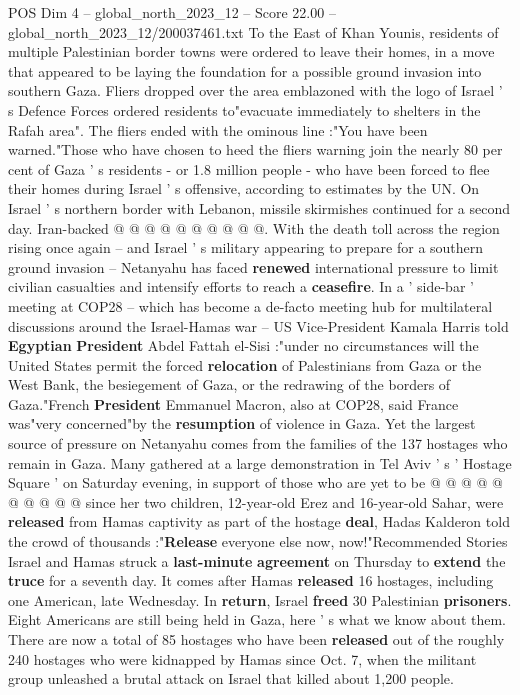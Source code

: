 \begin{textsample}{POS Dim 4 – global\_north\_2023\_12 – Score 22.00 – global\_north\_2023\_12/200037461.txt}
To the East of Khan Younis, residents of multiple Palestinian border towns were ordered to leave their homes, in a move that appeared to be laying the foundation for a possible ground invasion into southern Gaza.
Fliers dropped over the area emblazoned with the logo of Israel ' s Defence Forces ordered residents to"evacuate immediately to shelters in the Rafah area".
The fliers ended with the ominous line :"You have been warned."Those who have chosen to heed the fliers warning join the nearly 80 per cent of Gaza ' s residents - or 1.8 million people - who have been forced to flee their homes during Israel ' s offensive, according to estimates by the UN.
On Israel ' s northern border with Lebanon, missile skirmishes continued for a second day.
Iran-backed @ @ @ @ @ @ @ @ @ @.
With the death toll across the region rising once again -- and Israel ' s military appearing to prepare for a southern ground invasion -- Netanyahu has faced \textbf{renewed} international pressure to limit civilian casualties and intensify efforts to reach a \textbf{ceasefire}.
In a ' side-bar ' meeting at COP28 -- which has become a de-facto meeting hub for multilateral discussions around the Israel-Hamas war -- US Vice-President Kamala Harris told \textbf{Egyptian} \textbf{President} Abdel Fattah el-Sisi :"under no circumstances will the United States permit the forced \textbf{relocation} of Palestinians from Gaza or the West Bank, the besiegement of Gaza, or the redrawing of the borders of Gaza."French \textbf{President} Emmanuel Macron, also at COP28, said France was"very concerned"by the \textbf{resumption} of violence in Gaza.
Yet the largest source of pressure on Netanyahu comes from the families of the 137 hostages who remain in Gaza.
Many gathered at a large demonstration in Tel Aviv ' s ' Hostage Square ' on Saturday evening, in support of those who are yet to be @ @ @ @ @ @ @ @ @ @ since her two children, 12-year-old Erez and 16-year-old Sahar, were \textbf{released} from Hamas captivity as part of the hostage \textbf{deal}, Hadas Kalderon told the crowd of thousands :"\textbf{Release} everyone else now, now!"Recommended Stories Israel and Hamas struck a \textbf{last-minute} \textbf{agreement} on Thursday to \textbf{extend} the \textbf{truce} for a seventh day.
It comes after Hamas \textbf{released} 16 hostages, including one American, late Wednesday.
In \textbf{return}, Israel \textbf{freed} 30 Palestinian \textbf{prisoners}.
Eight Americans are still being held in Gaza, here ' s what we know about them.
There are now a total of 85 hostages who have been \textbf{released} out of the roughly 240 hostages who were kidnapped by Hamas since Oct. 7, when the militant group unleashed a brutal attack on Israel that killed about 1,200 people.

\end{textsample}
